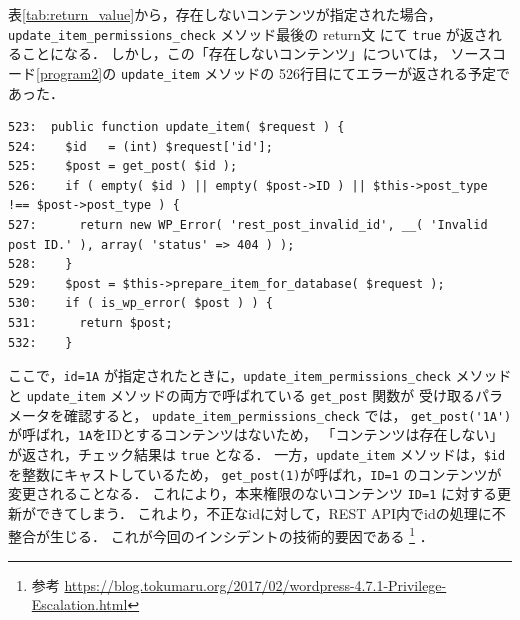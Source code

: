 \documentclass[uplatex]{jsarticle}
\begin{document}
表\ref{tab:return_value}から，存在しないコンテンツが指定された場合，
\verb|update_item_permissions_check| メソッド最後の return文 にて
\verb|true| が返されることになる．
しかし，この「存在しないコンテンツ」については，
ソースコード\ref{program2}の \verb|update_item| メソッドの 526行目にてエラーが返される予定であった．

\begin{lstlisting}[caption=update\_itemメソッド, label=program2]
523:  public function update_item( $request ) {
524:    $id   = (int) $request['id'];
525:    $post = get_post( $id );
526:    if ( empty( $id ) || empty( $post->ID ) || $this->post_type !== $post->post_type ) {
527:      return new WP_Error( 'rest_post_invalid_id', __( 'Invalid post ID.' ), array( 'status' => 404 ) );
528:    }
529:    $post = $this->prepare_item_for_database( $request );
530:    if ( is_wp_error( $post ) ) {
531:      return $post;
532:    }
\end{lstlisting}

ここで，\verb|id=1A| が指定されたときに，\verb|update_item_permissions_check| メソッドと
\verb|update_item| メソッドの両方で呼ばれている \verb|get_post| 関数が
受け取るパラメータを確認すると， \verb|update_item_permissions_check| では，
\verb|get_post('1A')| が呼ばれ，\verb|1A|をIDとするコンテンツはないため，
「コンテンツは存在しない」が返され，チェック結果は \verb|true| となる．
一方，\verb|update_item| メソッドは，\verb|$id| を整数にキャストしているため，
\verb|get_post(1)|が呼ばれ，\verb|ID=1| のコンテンツが変更されることなる．
これにより，本来権限のないコンテンツ \verb|ID=1| に対する更新ができてしまう．
これより，不正なidに対して，REST API内でidの処理に不整合が生じる．
これが今回のインシデントの技術的要因である
\footnote{
    参考
    \url{https://blog.tokumaru.org/2017/02/wordpress-4.7.1-Privilege-Escalation.html}
}
．
\end{document}
